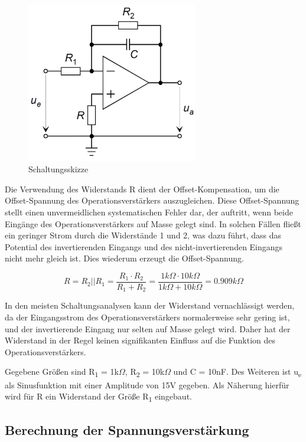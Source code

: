 \begin{figure}[H]
    \centering
    \includegraphics[height=7cm]{images/Versuch6/Schaltungsskizze.jpeg} 
    \caption{Schaltungsskizze}
    \label{fig: Schaltungsskizze}
\end{figure}


Die Verwendung des Widerstands R dient der Offset-Kompensation, 
um die Offset-Spannung des Operationsverstärkers auszugleichen. 
Diese Offset-Spannung stellt einen unvermeidlichen systematischen 
Fehler dar, der auftritt, wenn beide Eingänge des Operationsverstärkers
auf Masse gelegt sind. In solchen Fällen fließt ein geringer Strom 
durch die Widerstände 1 und 2, was dazu führt, dass das Potential 
des invertierenden Eingangs und des nicht-invertierenden Eingangs 
nicht mehr gleich ist. Dies wiederum erzeugt die Offset-Spannung.

\[
    R = R_2 || R_1 = \frac{R_1 \cdot R_2}{R_1 + R_2} = \frac{1k\Omega \cdot 10k\Omega}{1k\Omega + 10k\Omega} = 0.909 k\Omega
\]

In den meisten Schaltungsanalysen kann der Widerstand vernachlässigt 
werden, da der Eingangsstrom des Operationsverstärkers normalerweise 
sehr gering ist, und der invertierende Eingang nur selten auf Masse 
gelegt wird. Daher hat der Widerstand in der Regel keinen signifikanten
Einfluss auf die Funktion des Operationsverstärkers.

Gegebene Größen sind R\textsubscript{1} = 1k$\Omega$,
R\textsubscript{2} = 10k$\Omega$ und C = 10nF.
Des Weiteren ist u\textsubscript{e} als Sinusfunktion mit einer
Amplitude von 15V gegeben.
Als Näherung hierfür wird für R ein Widerstand der Größe
R\textsubscript{1} eingebaut. 

\subsection{Berechnung der Spannungsverstärkung}


